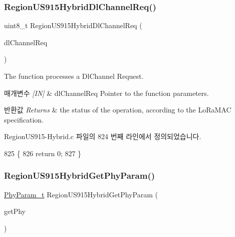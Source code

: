 \subsubsection{\texorpdfstring{Region\+U\+S915\+Hybrid\+Dl\+Channel\+Req()}{RegionUS915HybridDlChannelReq()}}
{\footnotesize\ttfamily uint8\+\_\+t Region\+U\+S915\+Hybrid\+Dl\+Channel\+Req (\begin{DoxyParamCaption}\item[{\mbox{\hyperlink{group___r_e_g_i_o_n_gae0d608ff1f8ea0a430e4f9a4c38ec7f3}{Dl\+Channel\+Req\+Params\+\_\+t}} $\ast$}]{dl\+Channel\+Req }\end{DoxyParamCaption})}



The function processes a Dl\+Channel Request. 


\begin{DoxyParams}{매개변수}
{\em \mbox{[}\+I\+N\mbox{]}} & dl\+Channel\+Req Pointer to the function parameters.\\
\hline
\end{DoxyParams}

\begin{DoxyRetVals}{반환값}
{\em Returns} & the status of the operation, according to the Lo\+Ra\+M\+AC specification. \\
\hline
\end{DoxyRetVals}


Region\+U\+S915-\/\+Hybrid.\+c 파일의 824 번째 라인에서 정의되었습니다.


\begin{DoxyCode}
825 \{
826     \textcolor{keywordflow}{return} 0;
827 \}
\end{DoxyCode}
\mbox{\label{group___r_e_g_i_o_n_u_s915_h_y_b_gaf078bd0d293c1a677ca53b7b6ca96c6e}} 
\subsubsection{\texorpdfstring{Region\+U\+S915\+Hybrid\+Get\+Phy\+Param()}{RegionUS915HybridGetPhyParam()}}
{\footnotesize\ttfamily \mbox{\hyperlink{group___r_e_g_i_o_n_gaed159b26e5c4677236b6e8677019db30}{Phy\+Param\+\_\+t}} Region\+U\+S915\+Hybrid\+Get\+Phy\+Param (\begin{DoxyParamCaption}\item[{\mbox{\hyperlink{group___r_e_g_i_o_n_gab471483fff904f4f89bbc03f7fc380ab}{Get\+Phy\+Params\+\_\+t}} $\ast$}]{get\+Phy }\end{DoxyParamCaption})}



